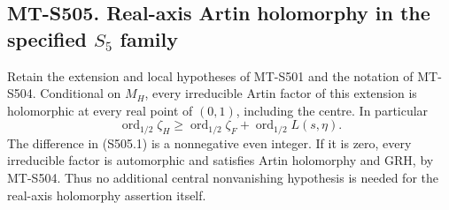 \subsection*{MT-S505. Real-axis Artin holomorphy in the specified $S_5$ family}

Retain the extension and local hypotheses of MT-S501 and the
notation of MT-S504. Conditional on $M_H$, every irreducible
Artin factor of this extension is holomorphic at every real
point of $(0,1)$, including the centre. In particular
\[
 \operatorname{ord}_{1/2}\zeta_H
  \ge \operatorname{ord}_{1/2}\zeta_F
                  +\operatorname{ord}_{1/2}L(s,\eta).
 \tag{S505.1}
\]
The difference in (S505.1) is a nonnegative even integer.
If it is zero, every irreducible factor is automorphic
and satisfies Artin holomorphy and GRH, by MT-S504.
Thus no additional central nonvanishing hypothesis is
needed for the real-axis holomorphy assertion itself.

